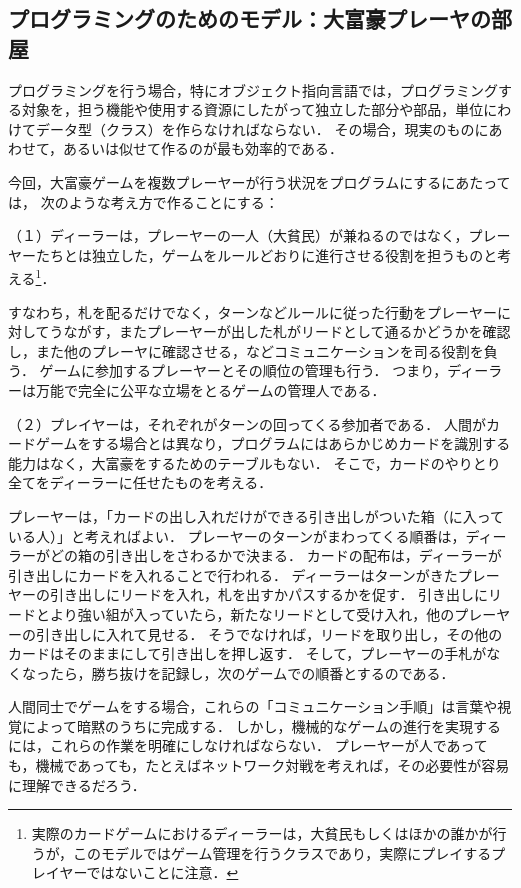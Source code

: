 \subsection{プログラミングのためのモデル：大富豪プレーヤの部屋}
プログラミングを行う場合，特にオブジェクト指向言語では，プログラミングする対象を，担う機能や使用する資源にしたがって独立した部分や部品，単位にわけてデータ型（クラス）を作らなければならない．
その場合，現実のものにあわせて，あるいは似せて作るのが最も効率的である．

今回，大富豪ゲームを複数プレーヤーが行う状況をプログラムにするにあたっては，
次のような考え方で作ることにする：

（１）ディーラーは，プレーヤーの一人（大貧民）が兼ねるのではなく，プレーヤーたちとは独立した，ゲームをルールどおりに進行させる役割を担うものと考える\footnote{実際のカードゲームにおけるディーラーは，大貧民もしくはほかの誰かが行うが，このモデルではゲーム管理を行うクラスであり，実際にプレイするプレイヤーではないことに注意．}．

すなわち，札を配るだけでなく，ターンなどルールに従った行動をプレーヤーに対してうながす，またプレーヤーが出した札がリードとして通るかどうかを確認し，また他のプレーヤに確認させる，などコミュニケーションを司る役割を負う．
ゲームに参加するプレーヤーとその順位の管理も行う．
つまり，ディーラーは万能で完全に公平な立場をとるゲームの管理人である．

（２）プレイヤーは，それぞれがターンの回ってくる参加者である．
人間がカードゲームをする場合とは異なり，プログラムにはあらかじめカードを識別する能力はなく，大富豪をするためのテーブルもない．
そこで，カードのやりとり全てをディーラーに任せたものを考える．

プレーヤーは，「カードの出し入れだけができる引き出しがついた箱（に入っている人）」と考えればよい．
プレーヤーのターンがまわってくる順番は，ディーラーがどの箱の引き出しをさわるかで決まる．
カードの配布は，ディーラーが引き出しにカードを入れることで行われる．
ディーラーはターンがきたプレーヤーの引き出しにリードを入れ，札を出すかパスするかを促す．
引き出しにリードとより強い組が入っていたら，新たなリードとして受け入れ，他のプレーヤーの引き出しに入れて見せる．
そうでなければ，リードを取り出し，その他のカードはそのままにして引き出しを押し返す．
そして，プレーヤーの手札がなくなったら，勝ち抜けを記録し，次のゲームでの順番とするのである．

人間同士でゲームをする場合，これらの「コミュニケーション手順」は言葉や視覚によって暗黙のうちに完成する．
しかし，機械的なゲームの進行を実現するには，これらの作業を明確にしなければならない．
プレーヤーが人であっても，機械であっても，たとえばネットワーク対戦を考えれば，その必要性が容易に理解できるだろう．



